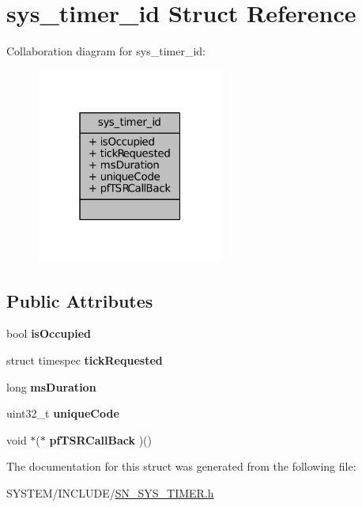 \hypertarget{structsys__timer__id}{}\section{sys\+\_\+timer\+\_\+id Struct Reference}
\label{structsys__timer__id}


Collaboration diagram for sys\+\_\+timer\+\_\+id\+:\nopagebreak
\begin{figure}[H]
\begin{center}
\leavevmode
\includegraphics[width=175pt]{structsys__timer__id__coll__graph}
\end{center}
\end{figure}
\subsection*{Public Attributes}
\begin{DoxyCompactItemize}
\item 
\mbox{\label{structsys__timer__id_a55210523b69657a190489db529bd4fdf}} 
bool {\bfseries is\+Occupied}
\item 
\mbox{\label{structsys__timer__id_a899a74c6215052931f6bfbb1c3ae9350}} 
struct timespec {\bfseries tick\+Requested}
\item 
\mbox{\label{structsys__timer__id_a61efc5c523c6660f23c756eea84e7148}} 
long {\bfseries ms\+Duration}
\item 
\mbox{\label{structsys__timer__id_abaa3ba091e654cc159d65b1ace3003bb}} 
uint32\+\_\+t {\bfseries unique\+Code}
\item 
\mbox{\label{structsys__timer__id_a7ed3a010e40e98312bb1f448fd297171}} 
void $\ast$($\ast$ {\bfseries pf\+T\+S\+R\+Call\+Back} )()
\end{DoxyCompactItemize}


The documentation for this struct was generated from the following file\+:\begin{DoxyCompactItemize}
\item 
S\+Y\+S\+T\+E\+M/\+I\+N\+C\+L\+U\+D\+E/\hyperlink{SN__SYS__TIMER_8h}{S\+N\+\_\+\+S\+Y\+S\+\_\+\+T\+I\+M\+E\+R.\+h}\end{DoxyCompactItemize}
